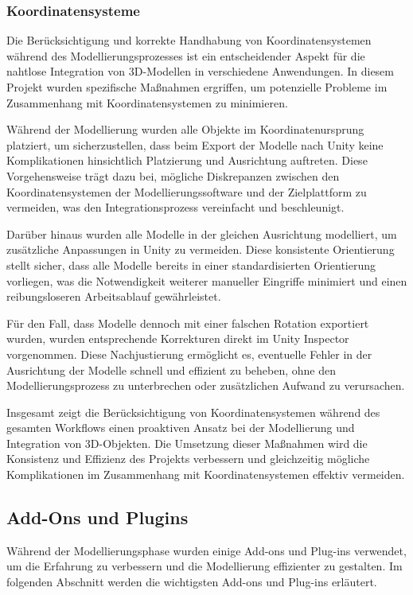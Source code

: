 \subsubsection{Koordinatensysteme}
Die Berücksichtigung und korrekte Handhabung von Koordinatensystemen während des Modellierungsprozesses ist ein
entscheidender Aspekt für die nahtlose Integration von 3D-Modellen in verschiedene Anwendungen. In diesem Projekt
wurden spezifische Maßnahmen ergriffen, um potenzielle Probleme im Zusammenhang mit Koordinatensystemen zu minimieren.

Während der Modellierung wurden alle Objekte im Koordinatenursprung platziert, um sicherzustellen, dass beim Export
der Modelle nach Unity keine Komplikationen hinsichtlich Platzierung und Ausrichtung auftreten. Diese Vorgehensweise
trägt dazu bei, mögliche Diskrepanzen zwischen den Koordinatensystemen der Modellierungssoftware und der Zielplattform
zu vermeiden, was den Integrationsprozess vereinfacht und beschleunigt.

Darüber hinaus wurden alle Modelle in der gleichen Ausrichtung modelliert, um zusätzliche Anpassungen in Unity zu
vermeiden. Diese konsistente Orientierung stellt sicher, dass alle Modelle bereits in einer standardisierten
Orientierung vorliegen, was die Notwendigkeit weiterer manueller Eingriffe minimiert und einen reibungsloseren
Arbeitsablauf gewährleistet.

Für den Fall, dass Modelle dennoch mit einer falschen Rotation exportiert wurden, wurden entsprechende Korrekturen
direkt im Unity Inspector vorgenommen. Diese Nachjustierung ermöglicht es, eventuelle Fehler in der Ausrichtung der
Modelle schnell und effizient zu beheben, ohne den Modellierungsprozess zu unterbrechen oder zusätzlichen Aufwand zu
verursachen.

Insgesamt zeigt die Berücksichtigung von Koordinatensystemen während des gesamten Workflows einen proaktiven Ansatz
bei der Modellierung und Integration von 3D-Objekten. Die Umsetzung dieser Maßnahmen wird die Konsistenz und Effizienz
des Projekts verbessern und gleichzeitig mögliche Komplikationen im Zusammenhang mit Koordinatensystemen effektiv
vermeiden.

\subsection{Add-Ons und Plugins}
Während der Modellierungsphase wurden einige Add-ons und Plug-ins verwendet, um die Erfahrung zu verbessern und die
Modellierung effizienter zu gestalten. Im folgenden Abschnitt werden die wichtigsten Add-ons und Plug-ins erläutert.

